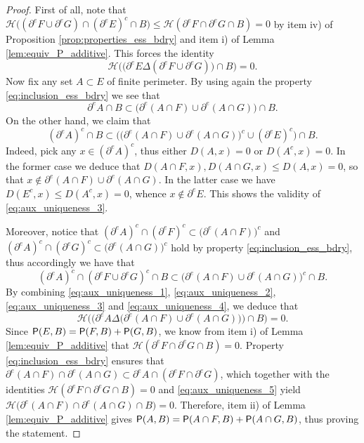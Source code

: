 \documentclass[reqno]{amsart}
\numberwithin{equation}{section}
\newcommand{\1}{\mathbbm 1}
\renewcommand{\P}{{\sf P}}
\renewcommand{\H}{{\mathcal H}}
\begin{document}
\begin{proof}
First of all, note that
\(\H\big((\partial^e F\cup\partial^e G)\cap(\partial^e E)^c\cap B\big)
\leq\H(\partial^e F\cap\partial^e G\cap B)=0\) by item iv) of Proposition
\ref{prop:properties_ess_bdry} and item i) of Lemma \ref{lem:equiv_P_additive}.
This forces the identity
\begin{equation}\label{eq:aux_uniqueness_1}
\H\Big(\big(\partial^e E\Delta(\partial^e F\cup\partial^e G)\big)\cap B\Big)=0.
\end{equation}
Now fix any set \(A\subset E\) of finite perimeter.
By using again the property \eqref{eq:inclusion_ess_bdry} we see that
\begin{equation}\label{eq:aux_uniqueness_2}
\partial^e A\cap B\subset
\big(\partial^e(A\cap F)\cup\partial^e(A\cap G)\big)\cap B.
\end{equation}
On the other hand, we claim that
\begin{equation}\label{eq:aux_uniqueness_3}
(\partial^e A)^c\cap B\subset\Big(\big(\partial^e(A\cap F)
\cup\partial^e(A\cap G)\big)^c\cup(\partial^e E)^c\Big)\cap B.
\end{equation}
Indeed, pick any \(x\in(\partial^e A)^c\), thus either \(D(A,x)=0\)
or \(D(A^c,x)=0\). In the former case we deduce that
\(D(A\cap F,x),D(A\cap G,x)\leq D(A,x)=0\), so that
\(x\notin\partial^e(A\cap F)\cup\partial^e(A\cap G)\).
In the latter case we have \(D(E^c,x)\leq D(A^c,x)=0\),
whence \(x\notin\partial^e E\). This shows the validity
of \eqref{eq:aux_uniqueness_3}.

Moreover, notice that
\((\partial^e A)^c\cap(\partial^e F)^c\subset\big(\partial^e(A\cap F)\big)^c\) and
\((\partial^e A)^c\cap(\partial^e G)^c\subset\big(\partial^e(A\cap G)\big)^c\) hold
by property \eqref{eq:inclusion_ess_bdry}, thus accordingly we have that
\begin{equation}\label{eq:aux_uniqueness_4}
(\partial^e A)^c\cap(\partial^e F\cup\partial^e G)^c\cap B
\subset\big(\partial^e(A\cap F)\cup\partial^e(A\cap G)\big)^c\cap B.
\end{equation}
By combining \eqref{eq:aux_uniqueness_1}, \eqref{eq:aux_uniqueness_2},
\eqref{eq:aux_uniqueness_3} and \eqref{eq:aux_uniqueness_4}, we deduce that
\begin{equation}\label{eq:aux_uniqueness_5}
\H\Big(\big(\partial^e A\Delta\big(\partial^e(A\cap F)
\cup\partial^e(A\cap G)\big)\big)\cap B\Big)=0.
\end{equation}
Since \(\P(E,B)=\P(F,B)+\P(G,B)\), we know from item i) of Lemma
\ref{lem:equiv_P_additive} that \(\H(\partial^e F\cap\partial^e G\cap B)=0\).
Property \eqref{eq:inclusion_ess_bdry} ensures that
\(\partial^e(A\cap F)\cap\partial^e(A\cap G)\subset
\partial^e A\cap(\partial^e F\cap\partial^e G)\), which together
with the identities \(\H(\partial^e F\cap\partial^e G\cap B)=0\)
and \eqref{eq:aux_uniqueness_5} yield
\(\H\big(\partial^e(A\cap F)\cap\partial^e(A\cap G)\cap B\big)=0\).
Therefore, item ii) of Lemma \ref{lem:equiv_P_additive} gives 
\(\P(A,B)=\P(A\cap F,B)+\P(A\cap G,B)\), thus proving the statement.
\end{proof}
\end{document}

